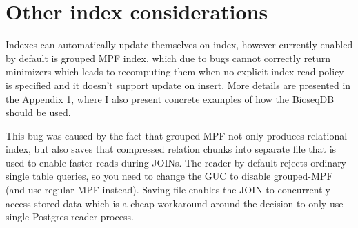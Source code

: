\section{Other index considerations}
\label{sec:index-operational-considerations}

Indexes can automatically update themselves on index, however currently enabled by default is grouped MPF index, which due to bugs cannot correctly 
return minimizers which leads to recomputing them when no explicit index read policy is specified and it doesn't support update on insert.
More details are presented in the Appendix 1, where I also present concrete examples of how the BioseqDB should be used.

This bug was caused by the fact that grouped MPF not only produces relational index, but also saves that compressed relation chunks into separate file that is used to enable faster reads during JOINs.
The reader by default rejects ordinary single table queries, so you need to change the GUC to disable grouped-MPF (and use regular MPF instead).
Saving file enables the JOIN to concurrently access stored data which is a cheap workaround around the decision to only use single Postgres reader process.

